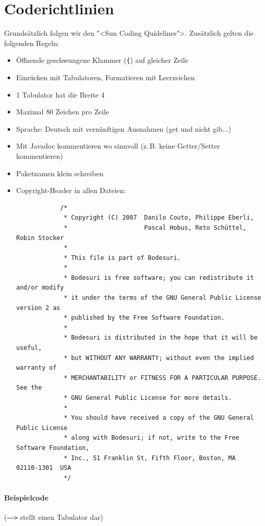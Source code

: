 \documentclass[12pt,halfparskip]{scrartcl}
\begin{document}


\section{Coderichtlinien}\label{sub:coderichtlinien} %

Grundsätzlich folgen wir den "<Sun Coding Quidelines">. Zusätzlich gelten die folgenden Regeln:

\begin{itemize}
  \item Öffnende geschwungene Klammer (\texttt{\{}) auf gleicher Zeile
  \item Einrücken mit Tabulatoren, Formatieren mit Leerzeichen
  \item 1 Tabulator hat die Breite 4
  \item Maximal 80 Zeichen pro Zeile
  \item Sprache: Deutsch mit vernünftigen Ausnahmen (get und nicht gib...)
  \item Mit Javadoc kommentieren wo sinnvoll (z.\,B. keine Getter/Setter kommentieren)
  \item Paketnamen klein schreiben
  \item Copyright-Header in allen Dateien:
    \begin{verbatim}
			/*
			 * Copyright (C) 2007  Danilo Couto, Philippe Eberli,
			 *                     Pascal Hobus, Reto Schüttel, Robin Stocker
			 *
			 * This file is part of Bodesuri.
			 *
			 * Bodesuri is free software; you can redistribute it and/or modify
			 * it under the terms of the GNU General Public License version 2 as
			 * published by the Free Software Foundation.
			 *
			 * Bodesuri is distributed in the hope that it will be useful,
			 * but WITHOUT ANY WARRANTY; without even the implied warranty of
			 * MERCHANTABILITY or FITNESS FOR A PARTICULAR PURPOSE.  See the
			 * GNU General Public License for more details.
			 *
			 * You should have received a copy of the GNU General Public License
			 * along with Bodesuri; if not, write to the Free Software Foundation,
			 * Inc., 51 Franklin St, Fifth Floor, Boston, MA  02110-1301  USA
			 */
    \end{verbatim}
\end{itemize}


\paragraph{Beispielcode} (\texttt{----->} stellt einen Tabulator dar)
\end{document}
